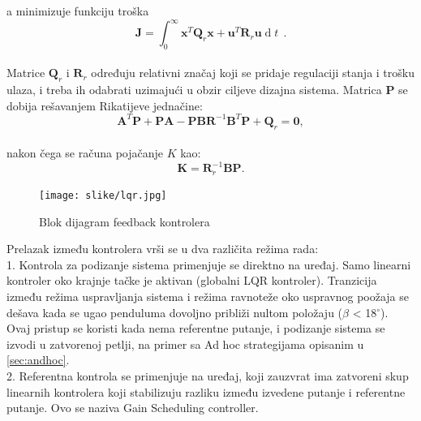 \documentclass[a4paper,11pt]{article}
\theoremstyle{definition} \newtheorem{deff}{Definicija}[section]
\theoremstyle{definition} \newtheorem{prim}[deff]{Primer}
\theoremstyle{plain} \newtheorem{teor}[deff]{Teorema}
\newcommand{\vect}[1]{\boldsymbol{\mathbf{#1}}}
\begin{document}
	a minimizuje funkciju troška\\
	
	\begin{equation}
		\vect{J} = \int_{0}^{\infty}  \vect{x}^T \vect{Q}_r \vect{x}  + \vect{u}^T \vect{R}_r \vect{u} \operatorname{d}t~~.
	\end{equation} \\
	
	Matrice $\vect{Q}_r$ i $\vect{R}_r$ određuju relativni značaj koji se pridaje regulaciji stanja i trošku ulaza, i treba ih odabrati uzimajući u obzir ciljeve dizajna sistema. Matrica $\vect{P}$ se dobija rešavanjem Rikatijeve jednačine: \\
	\begin{equation}
		\vect{A}^T \vect{P} + \vect{P} \vect{A} - \vect{P} \vect{B} \vect{R}^{-1} \vect{B}^T \vect{P} + \vect{Q}_r = \vect{0}, 
	\end{equation} \\
	
	nakon čega se računa pojačanje $K$ kao:
	\begin{equation}
		\vect{K} = \vect{R}_r^{-1}\vect{B}\vect{P}.
	\end{equation}
	
	\begin{figure}[!h]
		\centering
		\texttt{[image: slike/lqr.jpg]}
		\caption{Blok dijagram feedback kontrolera \cite{inicijalna}}
		\label{fig:lqr}
	\end{figure}
	
	
	
	Prelazak između kontrolera vrši se u dva različita režima rada: \\
	
	1. Kontrola za podizanje sistema primenjuje se direktno na uređaj. Samo linearni kontroler oko krajnje tačke je aktivan (globalni LQR kontroler). Tranzicija između režima uspravljanja sistema i režima ravnoteže oko uspravnog poožaja se dešava kada se ugao penduluma dovoljno približi nultom položaju ($\beta$ < 18$^\circ$). Ovaj pristup se koristi kada nema referentne putanje, i podizanje sistema se izvodi u zatvorenoj petlji, na primer sa Ad hoc strategijama opisanim u \ref{sec:andhoc}. \\
	
	2. Referentna kontrola se primenjuje na uređaj, koji zauzvrat ima zatvoreni skup linearnih kontrolera koji stabilizuju razliku između izvedene putanje i referentne putanje. Ovo se naziva Gain Scheduling controller.\\
	
\end{document}

